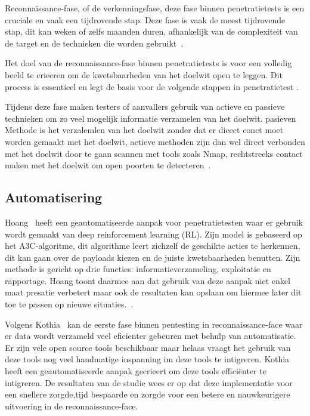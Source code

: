 Reconnaissance-fase, of de verkenningsfase, deze fase binnen penetratietests is een cruciale en vaak 
een tijdrovende stap. Deze fase is vaak de meest tijdrovende stap, dit kan weken of zelfs maanden 
duren, afhankelijk van de complexiteit van de target en de technieken die worden gebruikt~\autocite{Shah}. 

Het doel van de reconnaissance-fase binnen penetratietests is voor een volledig beeld te crieeren om de 
kwetsbaarheden van het doelwit open te leggen. Dit process is essentieel en legt de basis voor de
volgende stappen in penetratietest \autocite{Kothia}.

Tijdens deze fase maken testers of aanvallers gebruik van actieve en passieve technieken om zo veel
mogelijk informatie verzamelen van het doelwit. pasieven Methode is het verzalemlen van het doelwit 
zonder dat er dicect conct moet worden gemaakt met het doelwit, actieve methoden zijn dan wel direct
verbonden met het doelwit door te gaan scannen met tools zoals Nmap, rechtstreeks contact maken met 
het doelwit om open poorten te detecteren~\autocite{Shah}.

\subsection{Automatisering}

Hoang~\textcite{Hoang} heeft een geautomatiseerde aanpak voor penetratietesten waar er gebruik wordt gemaakt van deep reinforcement 
learning (RL). Zijn model is gebaseerd op het A3C-algoritme, dit algorithme leert zichzelf de geschikte acties te herkennen, dit kan 
gaan over de payloads kiezen en de juiste kwetsbaarheden benutten. Zijn  methode is gericht op drie functies: informatieverzameling, 
exploitatie en rapportage. Hoang toont daarmee aan dat gebruik van deze aanpak niet enkel maat presatie verbetert maar ook de resultaten 
kan opslaan om hiermee later dit toe te passen op nieuwe situaties.~\autocite{Hoang2023}.

Volgens Kothia~\textcite{Kothia} kan de eerste fase binnen pentesting in reconnaissance-face waar er data wordt verzameld veel 
eficienter gebeuren met behulp van automatisatie. Er zijn vele open source tools beschikbaar maar helaas vraagt het gebruik van deze 
tools nog veel handmatige inspanning im deze tools te intigreren. Kothia heeft een geautomatiseerde aanpak gecrieert om deze tools
efficiënter te intigreren. De resultaten van de studie wees er op dat deze implementatie voor een snellere zorgde,tijd 
bespaarde en zorgde voor een betere en nauwkeurigere uitvoering in de reconnaissance-face\autocite{Kothia2023}.


